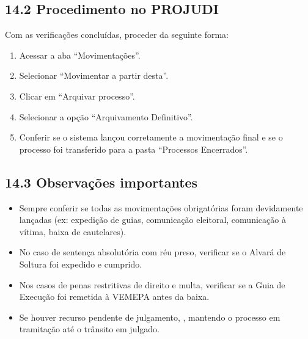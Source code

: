 \documentclass[letterpaper,10pt,brazil]{sphinxmanual}
\begin{document}
\subsection{14.2 \textendash{} Procedimento no PROJUDI}
\label{\detokenize{13baixa definitiva:procedimento-no-projudi}}
\sphinxAtStartPar
Com as verificações concluídas, proceder da seguinte forma:
\begin{enumerate}
%
\item {} 
\sphinxAtStartPar
Acessar a aba “Movimentações”.

\item {} 
\sphinxAtStartPar
Selecionar “Movimentar a partir desta”.

\item {} 
\sphinxAtStartPar
Clicar em “Arquivar processo”.

\item {} 
\sphinxAtStartPar
Selecionar a opção “Arquivamento Definitivo”.

\item {} 
\sphinxAtStartPar
Conferir se o sistema lançou corretamente a movimentação final e se o processo foi transferido para a pasta “Processos Encerrados”.

\end{enumerate}


\subsection{14.3 \textendash{} Observações importantes}
\label{\detokenize{13baixa definitiva:observacoes-importantes}}\begin{itemize}
\item {} 
\sphinxAtStartPar
Sempre conferir se todas as movimentações obrigatórias foram devidamente lançadas (ex: expedição de guias, comunicação eleitoral, comunicação à vítima, baixa de cautelares).

\item {} 
\sphinxAtStartPar
No caso de sentença absolutória com réu preso, verificar se o Alvará de Soltura foi expedido e cumprido.

\item {} 
\sphinxAtStartPar
Nos casos de penas restritivas de direito e multa, verificar se a Guia de Execução foi remetida à VEMEPA antes da baixa.

\item {} 
\sphinxAtStartPar
Se houver recurso pendente de julgamento, , mantendo o processo em tramitação até o trânsito em julgado.

\end{itemize}
\end{document}

